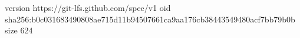 version https://git-lfs.github.com/spec/v1
oid sha256:b0c031683490808ae715d11b94507661ca9aa176cb38443549480acf7bb79b0b
size 624
